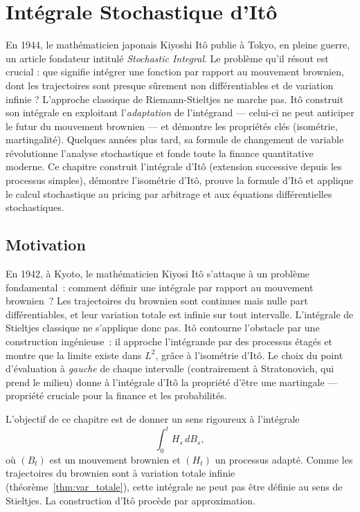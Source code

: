 \chapter{Int\'egrale Stochastique d'It\^o}
\label{ch:ito_integrale}

En 1944, le mathématicien japonais Kiyoshi Itô publie à Tokyo, en pleine guerre, un article fondateur intitulé \emph{Stochastic Integral}. Le problème qu'il résout est crucial : que signifie intégrer une fonction par rapport au mouvement brownien, dont les trajectoires sont presque sûrement non différentiables et de variation infinie ? L'approche classique de Riemann-Stieltjes ne marche pas. Itô construit son intégrale en exploitant l'\emph{adaptation} de l'intégrand --- celui-ci ne peut anticiper le futur du mouvement brownien --- et démontre les propriétés clés (isométrie, martingalité). Quelques années plus tard, sa formule de changement de variable révolutionne l'analyse stochastique et fonde toute la finance quantitative moderne. Ce chapitre construit l'intégrale d'Itô (extension successive depuis les processus simples), démontre l'isométrie d'Itô, prouve la formule d'Itô et applique le calcul stochastique au pricing par arbitrage et aux équations différentielles stochastiques.

\section{Motivation}

En 1942, \`a Kyoto, le math\'ematicien Kiyosi It\^o s'attaque \`a un probl\`eme fondamental~: comment d\'efinir une int\'egrale par rapport au mouvement brownien~? Les trajectoires du brownien sont continues mais nulle part diff\'erentiables, et leur variation totale est infinie sur tout intervalle. L'int\'egrale de Stieltjes classique ne s'applique donc pas. It\^o contourne l'obstacle par une construction ing\'enieuse~: il approche l'int\'egrande par des processus \'etag\'es et montre que la limite existe dans $L^2$, gr\^ace \`a l'isom\'etrie d'It\^o. Le choix du point d'\'evaluation \`a \emph{gauche} de chaque intervalle (contrairement \`a Stratonovich, qui prend le milieu) donne \`a l'int\'egrale d'It\^o la propri\'et\'e d'\^etre une martingale --- propri\'et\'e cruciale pour la finance et les probabilit\'es.

L'objectif de ce chapitre est de donner un sens rigoureux \`a l'int\'egrale
\[
  \int_0^t H_s \, dB_s,
\]
o\`u $(B_t)$ est un mouvement brownien et $(H_t)$ un processus adapt\'e. Comme
les trajectoires du brownien sont \`a variation totale infinie
(th\'eor\`eme~\ref{thm:var_totale}), cette int\'egrale ne peut pas \^etre d\'efinie au
sens de Stieltjes. La construction d'It\^o proc\`ede par approximation.

